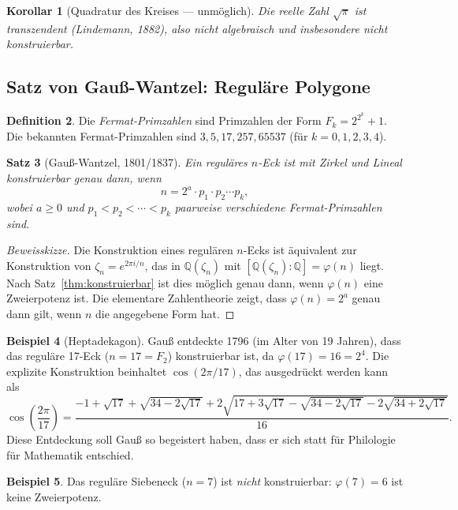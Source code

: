 \documentclass[12pt,a4paper]{amsart}
\newtheorem{theorem}{Satz}[section]
\newtheorem{korollar}[theorem]{Korollar}
\theoremstyle{definition}
\newtheorem{definition}[theorem]{Definition}
\newtheorem{beispiel}[theorem]{Beispiel}
\newcommand{\Q}{\mathbb{Q}}
\begin{document}
\begin{korollar}[Quadratur des Kreises — unmöglich]
Die reelle Zahl $\sqrt{\pi}$ ist transzendent (Lindemann, 1882), also nicht
algebraisch und insbesondere nicht konstruierbar.
\end{korollar}

\subsection{Satz von Gauß-Wantzel: Reguläre Polygone}

\begin{definition}
Die \emph{Fermat-Primzahlen} sind Primzahlen der Form $F_k = 2^{2^k} + 1$.
Die bekannten Fermat-Primzahlen sind $3, 5, 17, 257, 65537$
(für $k = 0,1,2,3,4$).
\end{definition}

\begin{theorem}[Gauß-Wantzel, 1801/1837]
\label{thm:gausswantzel}
Ein reguläres $n$-Eck ist mit Zirkel und Lineal konstruierbar genau dann, wenn
\[
  n = 2^a \cdot p_1 \cdot p_2 \cdots p_k,
\]
wobei $a \geq 0$ und $p_1 < p_2 < \cdots < p_k$ paarweise verschiedene
Fermat-Primzahlen sind.
\end{theorem}

\begin{proof}[Beweisskizze]
Die Konstruktion eines regulären $n$-Ecks ist äquivalent zur Konstruktion von
$\zeta_n = e^{2\pi i/n}$, das in $\Q(\zeta_n)$ mit $[\Q(\zeta_n):\Q] = \varphi(n)$
liegt. Nach Satz~\ref{thm:konstruierbar} ist dies möglich genau dann, wenn
$\varphi(n)$ eine Zweierpotenz ist. Die elementare Zahlentheorie zeigt, dass
$\varphi(n) = 2^a$ genau dann gilt, wenn $n$ die angegebene Form hat.
\end{proof}

\begin{beispiel}[Heptadekagon]
Gauß entdeckte 1796 (im Alter von 19 Jahren), dass das reguläre 17-Eck
($n = 17 = F_2$) konstruierbar ist, da $\varphi(17) = 16 = 2^4$. Die explizite
Konstruktion beinhaltet $\cos(2\pi/17)$, das ausgedrückt werden kann als
\[
  \cos\!\left(\frac{2\pi}{17}\right)
  = \frac{-1 + \sqrt{17} + \sqrt{34 - 2\sqrt{17}}
    + 2\sqrt{17 + 3\sqrt{17} - \sqrt{34-2\sqrt{17}} - 2\sqrt{34+2\sqrt{17}}}}{16}.
\]
Diese Entdeckung soll Gauß so begeistert haben, dass er sich statt für
Philologie für Mathematik entschied.
\end{beispiel}

\begin{beispiel}
Das reguläre Siebeneck ($n = 7$) ist \emph{nicht} konstruierbar:
$\varphi(7) = 6$ ist keine Zweierpotenz.
\end{beispiel}
\end{document}
